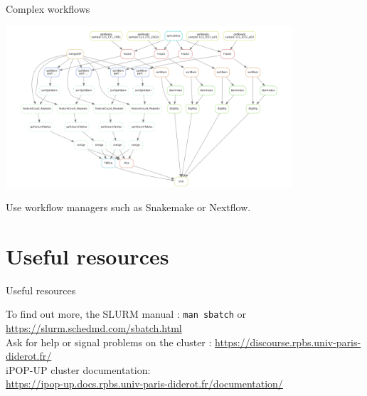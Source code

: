 \documentclass{beamer}
\begin{document}
\begin{frame}[fragile]{Complex workflows}
\begin{center}
    
\includegraphics[height = 6cm]{Images/snakemake.png} \\
\end{center}

Use workflow managers such as Snakemake or Nextflow. 
    
\end{frame}

\section{Useful resources}
\begin{frame}[fragile]{Useful resources}

    To find out more, the SLURM manual : \verb|man sbatch| or \href{https://slurm.schedmd.com/sbatch.html}{https://slurm.schedmd.com/sbatch.html} \\
    
    
    Ask for help or signal problems on the cluster : \href{https://discourse.rpbs.univ-paris-diderot.fr/}{https://discourse.rpbs.univ-paris-diderot.fr/} \\

    iPOP-UP cluster documentation: \\
    \href{https://ipop-up.docs.rpbs.univ-paris-diderot.fr/documentation/}
    {https://ipop-up.docs.rpbs.univ-paris-diderot.fr/documentation/}
    
\end{frame}
\end{document}
